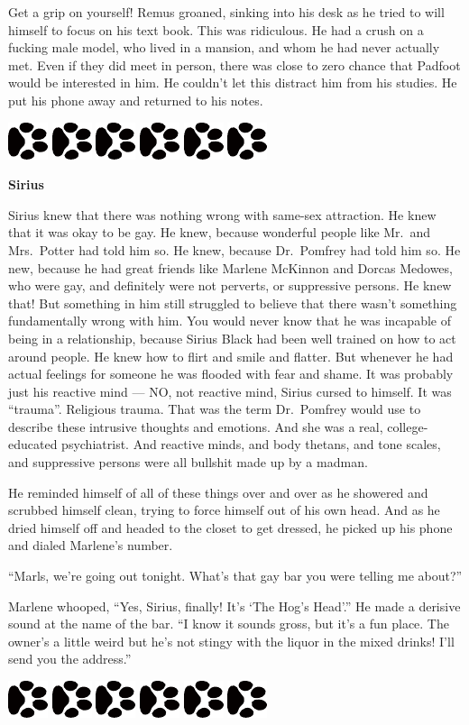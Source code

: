 \documentclass[12pt,twoside,openright]{memoir}
\newcommand{\dogPrintRule}{	
	\begin{center}
		\hspace{.5em}
		\includegraphics[angle=60]{dogprint.pdf}
		\hspace{.5em}
		\includegraphics[angle=120]{dogprint.pdf}
		\hspace{.5em}
		\includegraphics[angle=60]{dogprint.pdf}
		\hspace{.5em}
		\includegraphics[angle=120]{dogprint.pdf}
		\hspace{.5em}
		\includegraphics[angle=60]{dogprint.pdf}
		\hspace{.5em}
		\includegraphics[angle=120]{dogprint.pdf}
		\hspace{.5em}
	\end{center}
}
\begin{document}
Get a grip on yourself! Remus groaned, sinking into his desk as he tried to will himself to focus on his text book. This was ridiculous. He had a crush on a fucking male model, who lived in a mansion, and whom he had never actually met. Even if they did meet in person, there was close to zero chance that Padfoot would be interested in him. He couldn't let this distract him from his studies. He put his phone away and returned to his notes.

\dogPrintRule

\textbf{Sirius} 

Sirius knew that there was nothing wrong with same-sex attraction. He knew that it was okay to be gay. He knew, because wonderful people like Mr.\ and Mrs.\ Potter had told him so. He knew, because Dr.\ Pomfrey had told him so. He new, because he had great friends like Marlene McKinnon and Dorcas Medowes, who were gay, and definitely were not perverts, or suppressive persons. He knew that! But something in him still struggled to believe that there wasn't something fundamentally wrong with him. You would never know that he was incapable of being in a relationship, because Sirius Black had been well trained on how to act around people. He knew how to flirt and smile and flatter. But whenever he had actual feelings for someone he was flooded with fear and shame. It was probably just his reactive mind --- NO, not reactive mind, Sirius cursed to himself. It was ``trauma''. Religious trauma. That was the term Dr.\ Pomfrey would use to describe these intrusive thoughts and emotions. And she was a real, college-educated psychiatrist. And reactive minds, and body thetans, and tone scales, and suppressive persons were all bullshit made up by a madman.

He reminded himself of all of these things over and over as he showered and scrubbed himself clean, trying to force himself out of his own head. And as he dried himself off and headed to the closet to get dressed, he picked up his phone and dialed Marlene's number.

``Marls, we're going out tonight. What's that gay bar you were telling me about?''

Marlene whooped, ``Yes, Sirius, finally! It's `The Hog's Head'.'' He made a derisive sound at the name of the bar. ``I know it sounds gross, but it's a fun place. The owner's a little weird but he's not stingy with the liquor in the mixed drinks! I'll send you the address.''

\dogPrintRule
\end{document}
